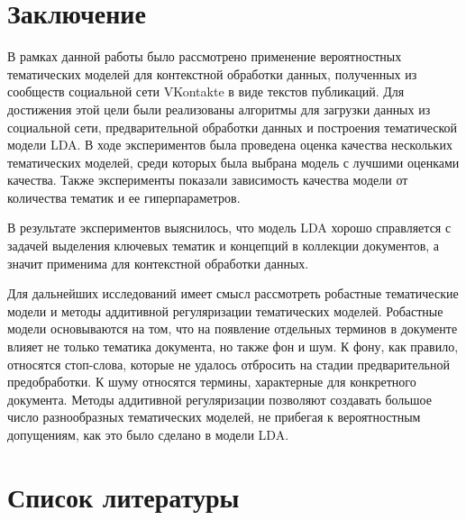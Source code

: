 \documentclass[a4paper]{report}
\begin{document}
 


	
	
	
	\newpage
	\section{Заключение}
	
	В рамках данной работы было рассмотрено применение вероятностных тематических моделей для контекстной обработки данных, полученных из сообществ социальной сети VKontakte в виде текстов публикаций. Для достижения этой цели были реализованы алгоритмы для загрузки данных из социальной сети, предварительной обработки данных и построения тематической модели LDA. В ходе экспериментов была проведена оценка качества нескольких тематических моделей, среди которых была выбрана модель с лучшими оценками качества. Также эксперименты показали зависимость качества модели от количества тематик и ее гиперпараметров.	
	
	 В результате экспериментов выяснилось, что модель LDA хорошо справляется с задачей выделения ключевых тематик и концепций в коллекции документов, а значит применима для контекстной обработки данных.
	
	Для дальнейших исследований имеет смысл рассмотреть робастные тематические модели и методы аддитивной регуляризации тематических моделей. Робастные модели основываются на том, что на появление отдельных терминов в документе влияет не только тематика документа, но также фон и шум. К фону, как правило, относятся стоп-слова, которые не удалось отбросить на стадии предварительной предобработки. К шуму относятся термины, характерные для конкретного документа. Методы аддитивной регуляризации позволяют создавать большое число разнообразных тематических моделей, не прибегая к вероятностным допущениям, как это было сделано в модели LDA. 
	
	
	
	\newpage
	\section{Список литературы}
	
\end{document}
